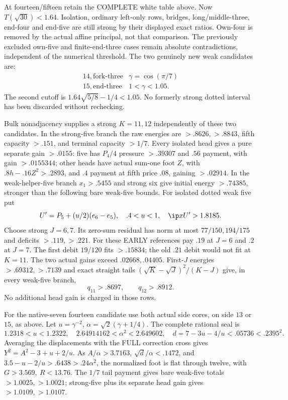 At fourteen/fifteen retain the COMPLETE white table above.
Now \(T(\sqrt{30})<1.64\).
Isolation, ordinary left-only rows, bridges, long/middle-three,
end-four and end-five are still strong by their displayed exact ratios.
Own-four is removed by the actual affine principal, not that comparison.
The previously excluded own-five and finite-end-three cases remain
absolute contradictions, independent of the numerical threshold.
The two genuinely new weak candidates are:
\[
 \begin{array}{c|c}
 14,\text{fork-three}&\gamma=\cos(\pi/7)\\
 15,\text{end-three}&1<\gamma<1.05 .
 \end{array}
\]
The second cutoff is
\(1.64\sqrt{5/8}-1/4<1.05\).
No formerly strong dotted interval has been discarded without rechecking.

Bulk nonadjacency supplies a strong \(K=11,12\) independently
of these two candidates. In the strong-five branch the raw energies
are \(>.8626,>.8843\), fifth capacity \(>.151\), and
terminal capacity \(>1/7\).
Every isolated head gives a pure separate gain \(>.0155\):
five has \(P_4/4\) pressure \(>.39307\) and \(.56\) payment,
with gain \(>.0155344\);
other heads have actual sum-one foot \(Z\), with
\(.8h-.16Z^2>.2893\), and \(.4\) payment at fifth price \(.08\),
gaining \(>.02914\).
In the weak-helper-five branch \(x_1>.5455\) and strong six
give initial energy \(>.74385\), stronger than the following
bare weak-five bounds.
For isolated dotted weak five put
\[
 U'=P_5+(u/2)(e_6-e_5),\quad .4<u<1,\quad \ip x{U'}>1.8185.
\]
Choose strong \(J=6,7\). Its zero-sum residual has norm at most
\(77/150,194/175\) and deficits \(>.119,>.221\).
For these EARLY references pay \(.19\) at \(J=6\) and \(.2\)
at \(J=7\). The first debit \(19/120\) fits \(>.15834\);
the old \(.21\) debit would not fit at \(K=11\).
The two actual gains exceed \(.02668,.04405\).
First-\(J\) energies \(>.69312,>.7139\) and exact straight tails
\((\sqrt K-\sqrt J)^2/(K-J)\) give, in every weak-five branch,
\[
 q_{11}>.8697,\qquad q_{12}>.8912 .
\]
No additional head gain is charged in those rows.

For the native-seven fourteen candidate use both actual side cores,
on side \(13\) or \(15\), as above.
Let \(u=\gamma^{-2}\), \(\alpha=\sqrt2(\gamma+1/4)\).
The complete rational seal is
\[
 1.2318<u<1.2322,\quad
 2.64914162<\alpha^2<2.649602,\quad
 d=7-3u-4/u<.05736<.2395^2 .
\]
Averaging the displacements with the FULL correction cross gives
\(Y^2=A^2-3+u+2/u\).
As \(A/\alpha>3.7163\), \(\sqrt d/\alpha<.1472\), and
\(3.5-u-2/u>.6438>.24\alpha^2\), the normalized foot is flat
through twelve, with \(G>3.569,\ R<13.76\).
The \(1/7\) tail payment gives bare weak-five totals
\(>1.0025,>1.0021\); strong-five plus its separate head gain
gives \(>1.0109,>1.0107\).

